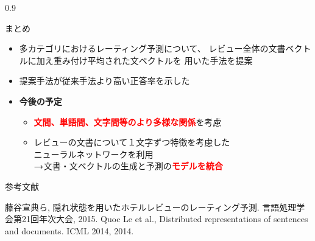 \documentclass[unicode,10pt]{beamer}
\newlength{\mycolumnwidth}
\newcommand{\arrow}{\textcolor{ttiblue}{\textbf{→}}\hspace{1ex}}
\newcommand{\itemtitle}[1]{\textbf{#1}\\}
\newcommand{\fire}[1]{\textcolor{red}{\textbf{#1}}}
\begin{document}
\begin{frame}[t]
\begin{columns}[onlytextwidth,t]
  \begin{column}{0.9\mycolumnwidth}
    \begin{block}{まとめ}
      \begin{itemize}
        \item 多カテゴリにおけるレーティング予測について、
              レビュー全体の文書ベクトルに加え重み付け平均された文ベクトルを
              用いた手法を提案
        \item 提案手法が従来手法\cite{fujitani15}より高い正答率を示した
        \item \itemtitle{今後の予定}
          \begin{itemize}
            \item \fire{文間、単語間、文字間等のより多様な関係}を考慮
            \item レビューの文書について１文字ずつ特徴を考慮した\\
                  ニューラルネットワークを利用 \\
                  \arrow 文書・文ベクトルの生成と予測の\fire{モデルを統合}
          \end{itemize}
      \end{itemize}
    \end{block}

    参考文献
    
    \begin{thebibliography}{9}
        藤谷宣典ら,
        隠れ状態を用いたホテルレビューのレーティング予測.
        言語処理学会第21回年次大会, 2015.
        Quoc Le et al.,
        Distributed representations of sentences and documents.
        ICML 2014, 2014.
    \end{thebibliography}
  \end{column}
\end{columns}

\end{frame}
\end{document}
